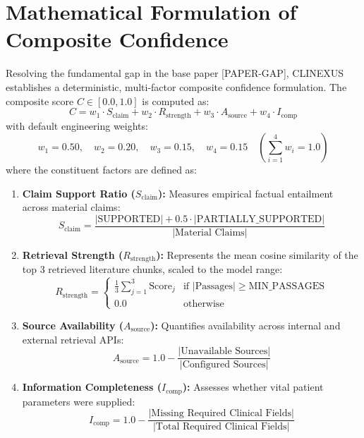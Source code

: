 \documentclass[12pt,a4paper]{report}
\begin{document}
\section{Mathematical Formulation of Composite Confidence}
Resolving the fundamental gap in the base paper [PAPER-GAP], CLINEXUS establishes a deterministic, multi-factor composite confidence formulation. The composite score $C \in [0.0, 1.0]$ is computed as:
\begin{equation}
    C = w_1 \cdot S_{\text{claim}} + w_2 \cdot R_{\text{strength}} + w_3 \cdot A_{\text{source}} + w_4 \cdot I_{\text{comp}}
\end{equation}
with default engineering weights:
\begin{equation}
    w_1 = 0.50, \quad w_2 = 0.20, \quad w_3 = 0.15, \quad w_4 = 0.15 \quad \left(\sum_{i=1}^4 w_i = 1.0\right)
\end{equation}
where the constituent factors are defined as:
\begin{enumerate}
    \item \textbf{Claim Support Ratio ($S_{\text{claim}}$):} Measures empirical factual entailment across material claims:
    \begin{equation}
        S_{\text{claim}} = \frac{|\text{SUPPORTED}| + 0.5 \cdot |\text{PARTIALLY\_SUPPORTED}|}{|\text{Material Claims}|}
    \end{equation}
    \item \textbf{Retrieval Strength ($R_{\text{strength}}$):} Represents the mean cosine similarity of the top 3 retrieved literature chunks, scaled to the model range:
    \begin{equation}
        R_{\text{strength}} = \begin{cases}
            \frac{1}{3} \sum_{j=1}^3 \text{Score}_j & \text{if } |\text{Passages}| \ge \text{MIN\_PASSAGES} \\
            0.0 & \text{otherwise}
        \end{cases}
    \end{equation}
    \item \textbf{Source Availability ($A_{\text{source}}$):} Quantifies availability across internal and external retrieval APIs:
    \begin{equation}
        A_{\text{source}} = 1.0 - \frac{|\text{Unavailable Sources}|}{|\text{Configured Sources}|}
    \end{equation}
    \item \textbf{Information Completeness ($I_{\text{comp}}$):} Assesses whether vital patient parameters were supplied:
    \begin{equation}
        I_{\text{comp}} = 1.0 - \frac{|\text{Missing Required Clinical Fields}|}{|\text{Total Required Clinical Fields}|}
    \end{equation}
\end{enumerate}
\end{document}
